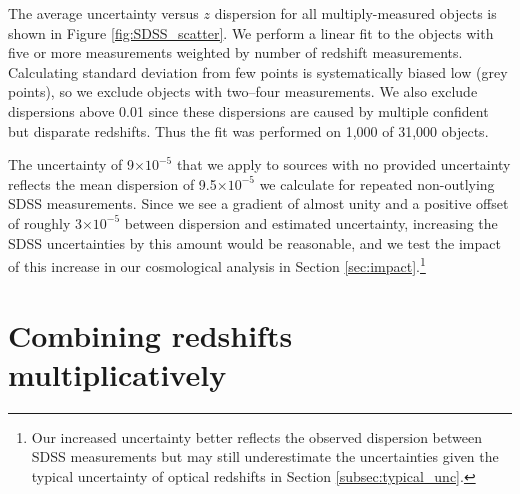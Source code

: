 \documentclass[
  journal=pasa,
  manuscript=research-paper,
  year=2022,
]{cup-journal}
\newcommand{\tten}[1]{\ensuremath{\times 10^{#1}}}
\begin{document}
The average uncertainty versus $z$ dispersion for all multiply-measured objects is shown in Figure \ref{fig:SDSS_scatter}.
We perform a linear fit to the objects with five or more measurements weighted by number of redshift measurements.
Calculating standard deviation from few points is systematically biased low (grey points), so we exclude objects with two--four measurements.
We also exclude dispersions above 0.01 since these dispersions are caused by multiple confident but disparate redshifts.
Thus the fit was performed on 1,000 of 31,000 objects.

The uncertainty of 9\tten{-5} that we apply to sources with no provided uncertainty reflects the mean dispersion of 9.5\tten{-5} we calculate for repeated non-outlying SDSS measurements. 
Since we see a gradient of almost unity and a positive offset of roughly 3\tten{-5} between dispersion and estimated uncertainty, increasing the SDSS uncertainties by this amount would be reasonable, and we test the impact of this increase in our cosmological analysis in Section \ref{sec:impact}.\footnote{Our increased uncertainty better reflects the observed dispersion between SDSS measurements but may still underestimate the uncertainties given the typical uncertainty of optical redshifts in Section \ref{subsec:typical_unc}.}

\section{Combining redshifts multiplicatively}\label{sec:convert2cmb}
\end{document}
